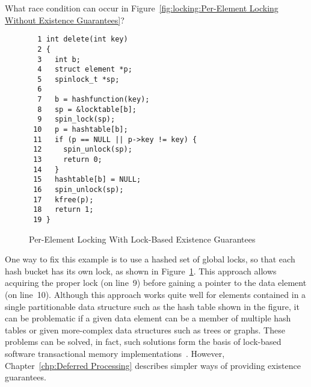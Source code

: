 \QuickQuiz{}
	What race condition can occur in
	Figure~\ref{fig:locking:Per-Element Locking Without Existence Guarantees}?
 \QuickQuizEnd

\begin{figure}[tbp]
{ \scriptsize
\begin{verbatim}
  1 int delete(int key)
  2 {
  3   int b;
  4   struct element *p;
  5   spinlock_t *sp;
  6
  7   b = hashfunction(key);
  8   sp = &locktable[b];
  9   spin_lock(sp);
 10   p = hashtable[b];
 11   if (p == NULL || p->key != key) {
 12     spin_unlock(sp);
 13     return 0;
 14   }
 15   hashtable[b] = NULL;
 16   spin_unlock(sp);
 17   kfree(p);
 18   return 1;
 19 }
\end{verbatim}
}
\caption{Per-Element Locking With Lock-Based Existence Guarantees}
\label{fig:locking:Per-Element Locking With Lock-Based Existence Guarantees}
\end{figure}

One way to fix this example is to use a hashed set of global locks, so
that each hash bucket has its own lock, as shown in
Figure~\ref{fig:locking:Per-Element Locking With Lock-Based Existence Guarantees}.
This approach allows acquiring the proper lock (on line~9) before
gaining a pointer to the data element (on line~10).
Although this approach works quite well for elements contained in a
single partitionable data structure such as the hash table shown in the
figure, it can be problematic if a given data element can be a member
of multiple hash tables or given more-complex data structures such
as trees or graphs.
These problems can be solved, in fact, such solutions form the basis
of lock-based software transactional memory
implementations~\cite{Shavit95,DaveDice2006DISC}.
However,
Chapter~\ref{chp:Deferred Processing}
describes simpler ways of providing existence guarantees.
